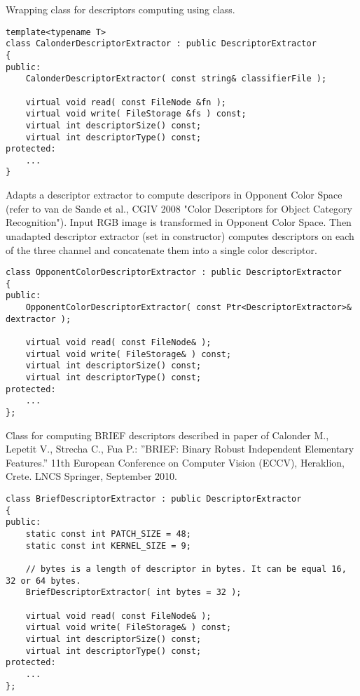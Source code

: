 Wrapping class for descriptors computing using  class.

\begin{lstlisting}
template<typename T>
class CalonderDescriptorExtractor : public DescriptorExtractor
{
public:
    CalonderDescriptorExtractor( const string& classifierFile );
    
    virtual void read( const FileNode &fn );
    virtual void write( FileStorage &fs ) const;
    virtual int descriptorSize() const;
    virtual int descriptorType() const;
protected:
    ...
}
\end{lstlisting}

Adapts a descriptor extractor to compute descripors in Opponent Color Space
(refer to van de Sande et al., CGIV 2008 "Color Descriptors for Object Category Recognition").
Input RGB image is transformed in Opponent Color Space. Then unadapted descriptor extractor
(set in constructor) computes descriptors on each of the three channel and concatenate
them into a single color descriptor.

\begin{lstlisting}
class OpponentColorDescriptorExtractor : public DescriptorExtractor
{
public:
    OpponentColorDescriptorExtractor( const Ptr<DescriptorExtractor>& dextractor );

    virtual void read( const FileNode& );
    virtual void write( FileStorage& ) const;
    virtual int descriptorSize() const;
    virtual int descriptorType() const;
protected:
    ...
};
\end{lstlisting}

Class for computing BRIEF descriptors described in paper of Calonder M., Lepetit V., 
Strecha C., Fua P.: ''BRIEF: Binary Robust Independent Elementary Features.'' 
11th European Conference on Computer Vision (ECCV), Heraklion, Crete. LNCS Springer, September 2010.

\begin{lstlisting}
class BriefDescriptorExtractor : public DescriptorExtractor
{
public:
    static const int PATCH_SIZE = 48;
    static const int KERNEL_SIZE = 9;

    // bytes is a length of descriptor in bytes. It can be equal 16, 32 or 64 bytes.
    BriefDescriptorExtractor( int bytes = 32 );

    virtual void read( const FileNode& );
    virtual void write( FileStorage& ) const;
    virtual int descriptorSize() const;
    virtual int descriptorType() const;
protected:
    ...
};
\end{lstlisting}
    
